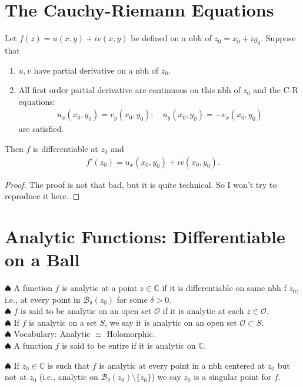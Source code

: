 \documentclass{article}
\theoremstyle{definition}
\newcommand{\C}{\mathbb{C}}
\newcommand{\B}{\mathcal{B}}
\begin{document}
\section{The Cauchy-Riemann Equations}

Let $f(z) = u(x,y) + iv(x,y)$ be defined on a nbh of $z_0 = x_0 + iy_0$. Suppose that 
\begin{enumerate}
	\item $u,v$ have partial derivative on a nbh of $z_0$.
	\item All first order partial derivative are continuous on this nbh of $z_0$ and the C-R equations:
	\begin{align}
	u_x(x_0,y_0) = v_y(x_0,y_0);\quad u_y(x_0,y_0) = -v_x(x_0,y_0)
	\end{align}
	are satisfied.
\end{enumerate}
Then $f$ is differentiable at $z_0$ and
\begin{align}
f'(z_0) = u_x(x_0,y_0) + iv(x_0,y_0).
\end{align}


\begin{proof}
	The proof is not that bad, but it is quite technical. So I won't try to reproduce it here.
\end{proof}


\section{Analytic Functions: Differentiable on a Ball}

\noindent $\spadesuit$ A function $f$ is analytic at a point $z \in \C$ if it is differentiable on same nbh f $z_0$, i.e., at every point in $\B_\delta(z_0)$ for some $\delta > 0$.\\

\noindent $\spadesuit$ $f$ is said to be analytic on an open set $\mathcal{O}$ if it is analytic at each $z\in \mathcal{O}$.\\

\noindent $\spadesuit$ If $f$ is analytic on a set $S$, we say it is analytic on an open set $\mathcal{O} \subset S$. \\

\noindent $\spadesuit$ Vocabulary: Analytic $\equiv$ Holomorphic.\\

\noindent $\spadesuit$ A function $f$ is said to be entire if it is analytic on $\C$.

\noindent $\spadesuit$ If $z_0 \in \C$ is such that $f$ is analytic at every point in a nbh centered at $z_0$ but not at $z_0$ (i.e., analytic on $\B_\delta(z_0)\setminus \{z_0\}$) we say $z_0$ is a singular point for $f$. \\
\end{document}
